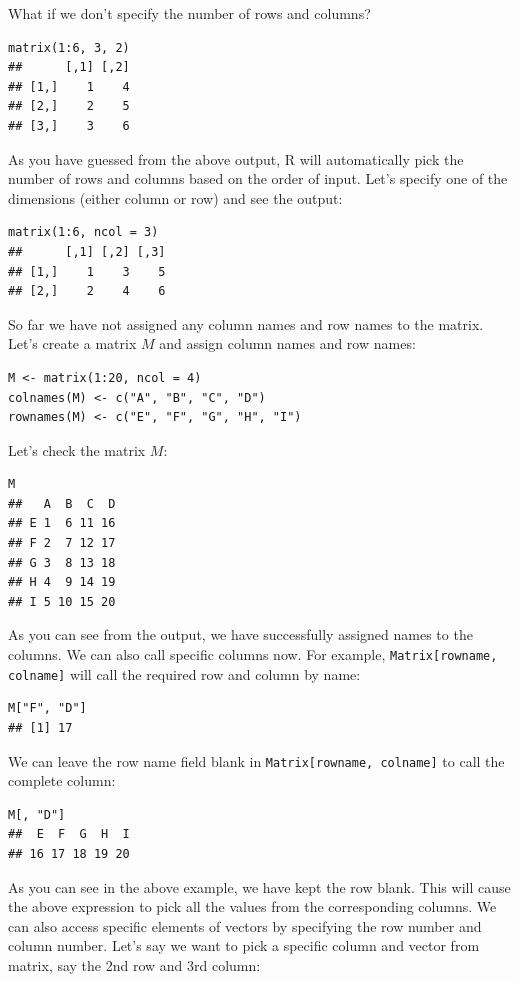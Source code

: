 \documentclass[12pt]{book}
\begin{document}
What if we don’t specify the number of rows and columns?

\begin{verbatim}
matrix(1:6, 3, 2)
##      [,1] [,2]
## [1,]    1    4
## [2,]    2    5
## [3,]    3    6
\end{verbatim}

As you have guessed from the above output, R will automatically pick the number of rows and columns based on the order of input. Let’s specify one of the dimensions (either column or row) and see the output:

\begin{verbatim}
matrix(1:6, ncol = 3)
##      [,1] [,2] [,3]
## [1,]    1    3    5
## [2,]    2    4    6
\end{verbatim}

So far we have not assigned any column names and row names to the matrix. Let’s create a matrix \( M \) and assign column names and row names:

\begin{verbatim}
M <- matrix(1:20, ncol = 4)
colnames(M) <- c("A", "B", "C", "D")
rownames(M) <- c("E", "F", "G", "H", "I")
\end{verbatim}

Let’s check the matrix \( M \):

\begin{verbatim}
M
##   A  B  C  D
## E 1  6 11 16
## F 2  7 12 17
## G 3  8 13 18
## H 4  9 14 19
## I 5 10 15 20
\end{verbatim}

As you can see from the output, we have successfully assigned names to the columns. We can also call specific columns now. For example, \texttt{Matrix[rowname, colname]} will call the required row and column by name:

\begin{verbatim}
M["F", "D"]
## [1] 17
\end{verbatim}

We can leave the row name field blank in \texttt{Matrix[rowname, colname]} to call the complete column:

\begin{verbatim}
M[, "D"]
##  E  F  G  H  I 
## 16 17 18 19 20
\end{verbatim}

As you can see in the above example, we have kept the row blank. This will cause the above expression to pick all the values from the corresponding columns. We can also access specific elements of vectors by specifying the row number and column number. Let’s say we want to pick a specific column and vector from matrix, say the 2nd row and 3rd column:
\end{document}
